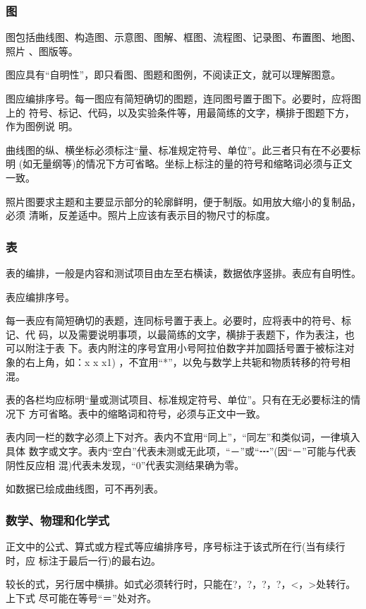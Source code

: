 \documentclass[oneside, phd]{njuthesis}
\begin{document}
\subsubsection{图}

图包括曲线图、构造图、示意图、图解、框图、流程图、记录图、布置图、地图、照片
、图版等。

图应具有“自明性”，即只看图、图题和图例，不阅读正文，就可以理解图意。

图应编排序号。每一图应有简短确切的图题，连同图号置于图下。必要时，应将图上的
符号、标记、代码，以及实验条件等，用最简练的文字，横排于图题下方，作为图例说
明。

曲线图的纵、横坐标必须标注“量、标准规定符号、单位”。此三者只有在不必要标明
(如无量纲等)的情况下方可省略。坐标上标注的量的符号和缩略词必须与正文一致。

照片图要求主题和主要显示部分的轮廓鲜明，便于制版。如用放大缩小的复制品，必须
清晰，反差适中。照片上应该有表示目的物尺寸的标度。

\subsubsection{表}

表的编排，一般是内容和测试项目由左至右横读，数据依序竖排。表应有自明性。

表应编排序号。

每一表应有简短确切的表题，连同标号置于表上。必要时，应将表中的符号、标记、代
码，以及需要说明事项，以最简练的文字，横排于表题下，作为表注，也可以附注于表
下。表内附注的序号宜用小号阿拉伯数字并加圆括号置于被标注对象的右上角，如：x
 x x1) ，不宜用“*”，以免与数学上共轭和物质转移的符号相混。

表的各栏均应标明“量或测试项目、标准规定符号、单位”。只有在无必要标注的情况下
方可省略。表中的缩略词和符号，必须与正文中一致。

表内同一栏的数字必须上下对齐。表内不宜用“同上”，“同左”和类似词，一律填入具体
数字或文字。表内“空白”代表未测或无此项，“－”或“┅”(因“－”可能与代表阴性反应相
混)代表未发现，“0”代表实测结果确为零。

如数据已绘成曲线图，可不再列表。

\subsubsection{数学、物理和化学式}

正文中的公式、算式或方程式等应编排序号，序号标注于该式所在行(当有续行时，应
标注于最后一行)的最右边。

较长的式，另行居中横排。如式必须转行时，只能在?，?，?，?，<，>处转行。上下式
尽可能在等号“＝”处对齐。
\end{document}
